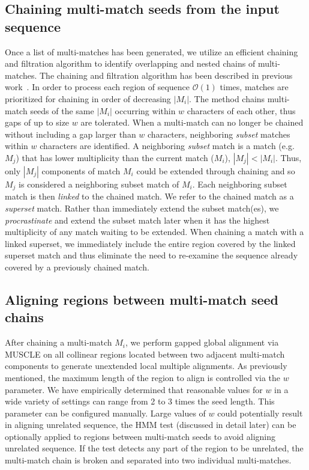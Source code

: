 \documentclass[9.5pt,journal,final,finalsubmission,twocolumn]{IEEEtran}
\begin{document}
\subsection{Chaining multi-match seeds from the input sequence}
Once a list of multi-matches has been generated, we utilize an
efficient chaining and filtration algorithm to identify overlapping
and nested chains of multi-matches.  The chaining and filtration algorithm has been described in previous work~\cite{ref-procrast}. In order to
process each region of sequence $\mathcal{O}(1)$ times, matches
are prioritized for chaining in order of decreasing $|M_i|$.  The
method chains multi-match seeds of the same $|M_i|$
occurring within $w$ characters of each other, thus gaps of up to size
$w$ are tolerated.  When a multi-match can
no longer be chained without including a gap larger than $w$
characters, neighboring \textit{subset} matches within $w$ characters
are identified. A neighboring \textit{subset} match is a match (e.g. $M_j$) that has lower multiplicity
than the current match ($M_i$), $|M_j| < |M_i|$. Thus, only $|M_j|$ components of match $M_i$ could be extended through
chaining and so $M_j$ is considered a neighboring subset match of $M_i$. Each neighboring subset match is then \textit{linked}
to the chained match. We refer to the chained match as a
\textit{superset} match. Rather than immediately extend the subset
match(es), we \textit{procrastinate} and extend the subset match later
when it has the highest multiplicity of any match waiting to be
extended. When chaining a match with a linked superset, we immediately
include the entire region covered by the linked superset match and
thus eliminate the need to re-examine the sequence already covered by a
previously chained match.

\subsection{Aligning regions between multi-match seed chains}
After chaining a multi-match $M_i$, we perform gapped global alignment via MUSCLE on all
collinear regions located between two adjacent multi-match components to generate
unextended local multiple alignments. As previously mentioned, the maximum length of the region to align
is controlled via the $w$ parameter. We have empirically determined that reasonable values
for $w$ in a wide variety of settings can range from 2 to 3 times the seed length. This
parameter can be configured manually. Large values of
$w$ could potentially result in aligning unrelated sequence, the HMM test (discussed in detail later) can be optionally applied
to regions between multi-match seeds to avoid aligning unrelated sequence. If the test detects any part of the
region to be unrelated, the multi-match chain is broken and separated into two individual multi-matches.
\end{document}
